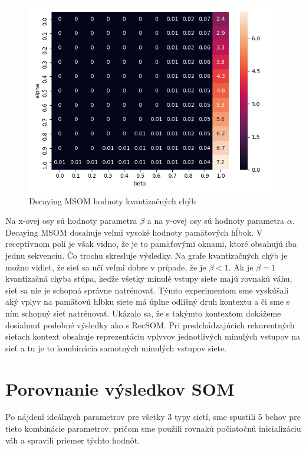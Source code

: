     \begin{figure}[H]
        \centering
        \includegraphics[width=\textwidth]{assets/decay_msom_errors}
        \caption{Decaying MSOM hodnoty kvantizačných chýb}
    \end{figure}

    
Na x-ovej osy sú hodnoty parametra $\beta$ a na y-ovej osy sú hodnoty parametra $\alpha$.
Decaying MSOM dosahuje veľmi vysoké hodnoty pamäťových hĺbok. 
V receptívnom poli je však vidno, že je to pamäťovými oknami, ktoré obsahujú iba jednu sekvenciu. Čo trochu skresľuje výsledky.
Na grafe kvantizačných chýb je možno vidieť, že sieť sa učí veľmi dobre v prípade, že je $\beta < 1$. Ak je $\beta = 1$ kvantizačná chyba stúpa, keďže všetky minulé vstupy siete
majú rovnakú váhu, sieť sa nie je schopná správne natrénovať.
Týmto experimentom sme vyskúšali aký vplyv na pamäťovú hĺbku siete má úplne odlišný druh kontextu a či sme s ním schopný sieť natrénovať.
Ukázalo sa, že s takýmto kontextom dokážeme dosiahnuť podobné výsledky ako s RecSOM. 
Pri predchádzajúcich rekurentných sieťach kontext obsahuje reprezentáciu vplyvov jednotlivých minulých vstupov na sieť a tu je to kombinácia samotných minulých vstupov siete. 


\section {Porovnanie výsledkov SOM}
Po nájdení ideálnych parametrov pre všetky 3 typy sietí, sme spustili 5 behov pre tieto kombinácie parametrov,
pričom sme použili rovnakú počiatočnú inicializáciu váh a spravili priemer týchto hodnôt.

